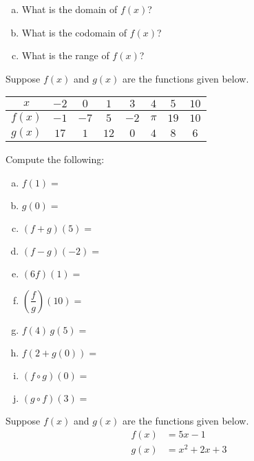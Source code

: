 \documentclass[11pt,letterpaper]{article}
\begin{document}
\begin{enumerate}[(a)]
\item What is the domain of $f(x)$?
\item What is the codomain of $f(x)$?
\item What is the range of $f(x)$?
\end{enumerate}



\newpage



 Suppose $f(x)$ and $g(x)$ are the functions given below. 
        \begin{table}[!ht]
        \centering
        \begin{tabular}{| c || c | c | c | c | c | c | c |} \hline
	$x$ & $-2$ & $0$ & $1$ & $3$ & $4$ & $5$ & $10$ \\ \hline
	$f(x)$ & $-1$ & $-7$ & $5$ & $-2$ & $\pi$ & $19$ & $10$ \\ \hline
	$g(x)$ & $17$ & $1$ & $12$ & $0$ & $4$ & $8$ & $6$ \\ \hline
        \end{tabular}
        \end{table}


Compute the following: \pspace
        \begin{enumerate}[(a)]
        \item $f(1)=$ \vfill
        \item $g(0)=$ \vfill
        \item $(f + g)(5)=$ \vfill
        \item $(f - g)(-2)=$ \vfill
        \item $(6f)(1)=$ \vfill
        \item $\left(\dfrac{f}{g}\right)(10)=$ \vfill
        \item $f(4)\, g(5)=$ \vfill
        \item $f(2 + g(0))=$ \vfill
        \item $(f \circ g)(0)=$ \vfill
        \item $(g \circ f)(3)=$ \vfill
        \end{enumerate}



\newpage



 Suppose $f(x)$ and $g(x)$ are the functions given below. 
	\[
	\begin{aligned}
	f(x)&= 5x - 1 \\[0.3cm]
	g(x)&= x^2 + 2x + 3
	\end{aligned}
	\]
\end{document}
